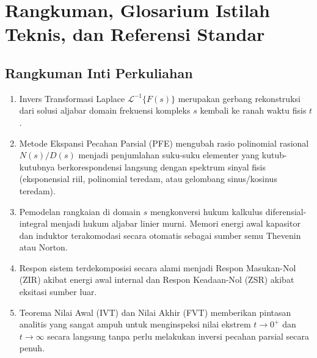 \documentclass[11pt,a4paper]{article}
\theoremstyle{definition}
\begin{document}
\section{Rangkuman, Glosarium Istilah Teknis, dan Referensi Standar}

\subsection{Rangkuman Inti Perkuliahan}
\begin{enumerate}[leftmargin=*]
    \item Invers Transformasi Laplace $\mathcal{L}^{-1}\{F(s)\}$ merupakan gerbang rekonstruksi dari solusi aljabar domain frekuensi kompleks $s$ kembali ke ranah waktu fisis $t$.
    \item Metode Ekspansi Pecahan Parsial (PFE) mengubah rasio polinomial rasional $N(s)/D(s)$ menjadi penjumlahan suku-suku elementer yang kutub-kutubnya berkorespondensi langsung dengan spektrum sinyal fisis (eksponensial riil, polinomial teredam, atau gelombang sinus/kosinus teredam).
    \item Pemodelan rangkaian di domain $s$ mengkonversi hukum kalkulus diferensial-integral menjadi hukum aljabar linier murni. Memori energi awal kapasitor dan induktor terakomodasi secara otomatis sebagai sumber semu Thevenin atau Norton.
    \item Respon sistem terdekomposisi secara alami menjadi Respon Masukan-Nol (ZIR) akibat energi awal internal dan Respon Keadaan-Nol (ZSR) akibat eksitasi sumber luar.
    \item Teorema Nilai Awal (IVT) dan Nilai Akhir (FVT) memberikan pintasan analitis yang sangat ampuh untuk menginspeksi nilai ekstrem $t \to 0^+$ dan $t \to \infty$ secara langsung tanpa perlu melakukan inversi pecahan parsial secara penuh.
\end{enumerate}
\end{document}

